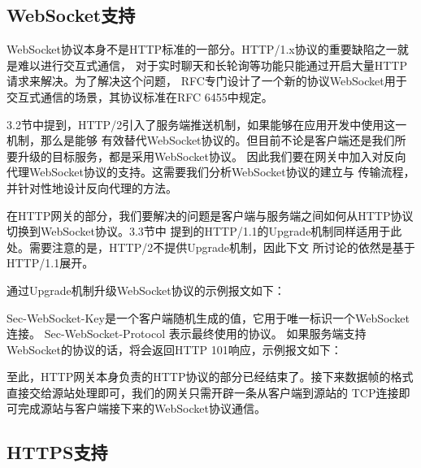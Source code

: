 \documentclass[twoside]{CUGThesis}
\begin{document}
	\subsection{WebSocket支持}
	WebSocket协议本身不是HTTP标准的一部分。HTTP/1.x协议的重要缺陷之一就是难以进行交互式通信，
	对于实时聊天和长轮询等功能只能通过开启大量HTTP请求来解决。为了解决这个问题，
	RFC专门设计了一个新的协议WebSocket用于交互式通信的场景，其协议标准在RFC 6455中规定\cite{fette2011websocket}。\par
	3.2节中提到，HTTP/2引入了服务端推送机制，如果能够在应用开发中使用这一机制，那么是能够
	有效替代WebSocket协议的。但目前不论是客户端还是我们所要升级的目标服务，都是采用WebSocket协议。
	因此我们要在网关中加入对反向代理WebSocket协议的支持。这需要我们分析WebSocket协议的建立与
	传输流程，并针对性地设计反向代理的方法。\par
	在HTTP网关的部分，我们要解决的问题是客户端与服务端之间如何从HTTP协议切换到WebSocket协议。3.3节中
	提到的HTTP/1.1的Upgrade机制同样适用于此处。需要注意的是，HTTP/2不提供Upgrade机制，因此下文
	所讨论的依然是基于HTTP/1.1展开。\par
	通过Upgrade机制升级WebSocket协议的示例报文如下：\\ 
	 \par
	Sec-WebSocket-Key是一个客户端随机生成的值，它用于唯一标识一个WebSocket连接。
    Sec-WebSocket-Protocol 表示最终使用的协议。	
	如果服务端支持WebSocket的协议的话，将会返回HTTP 101响应，示例报文如下：\\
	 \par
	至此，HTTP网关本身负责的HTTP协议的部分已经结束了。接下来数据帧的格式直接交给源站处理即可，我们的网关只需开辟一条从客户端到源站的
	TCP连接即可完成源站与客户端接下来的WebSocket协议通信。
	\subsection{HTTPS支持}
\end{document}
